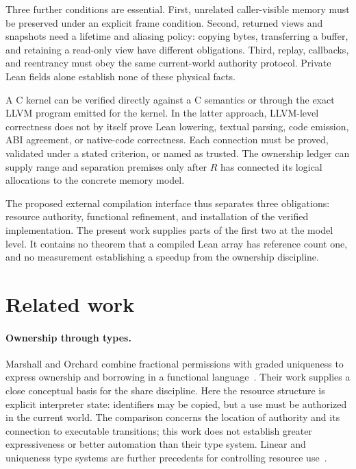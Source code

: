 \documentclass[a4paper,UKenglish,cleveref]{lipics-v2021}
\begin{document}
Three further conditions are essential. First, unrelated caller-visible memory
must be preserved under an explicit frame condition. Second, returned views and
snapshots need a lifetime and aliasing policy: copying bytes, transferring a
buffer, and retaining a read-only view have different obligations. Third,
replay, callbacks, and reentrancy must obey the same current-world authority
protocol. Private Lean fields alone establish none of these physical facts.

A C kernel can be verified directly against a C semantics or through the exact
LLVM program emitted for the kernel. In the latter approach, LLVM-level
correctness does not by itself prove Lean lowering, textual parsing, code
emission, ABI agreement, or native-code correctness. Each connection must be
proved, validated under a stated criterion, or named as trusted. The ownership
ledger can supply range and separation premises only after $R$ has connected its
logical allocations to the concrete memory model.

The proposed external compilation interface thus separates three obligations:
resource authority, functional refinement, and installation of the verified
implementation. The present work supplies parts of the first two at the model
level. It contains no theorem that a compiled Lean array has reference count
one, and no measurement establishing a speedup from the ownership discipline.

\section{Related work}
\label{sec:related}

\paragraph*{Ownership through types.}
Marshall and Orchard combine fractional permissions with graded uniqueness to
express ownership and borrowing in a functional language~\cite{marshall}.
Their work supplies a close conceptual basis for the share discipline. Here the
resource structure is explicit interpreter state: identifiers may be copied,
but a use must be authorized in the current world. The comparison concerns the
location of authority and its connection to executable transitions; this work
does not establish greater expressiveness or better automation than their type
system. Linear and uniqueness type systems are further precedents for
controlling resource use~\cite{linearhaskell,clean}.
\end{document}
